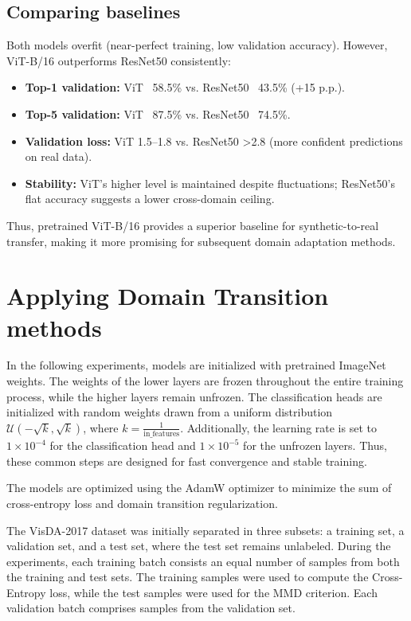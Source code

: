 \documentclass[a4paper,12pt]{extarticle}
\begin{document}
\subsection{Comparing baselines}
Both models overfit (near-perfect training, low validation accuracy). However, ViT-B/16 outperforms ResNet50
consistently:
\begin{itemize}
	\item \textbf{Top-1 validation:} ViT ~58.5\% vs. ResNet50 ~43.5\% (+15 p.p.).
	\item \textbf{Top-5 validation:} ViT ~87.5\% vs. ResNet50 ~74.5\%.
	\item \textbf{Validation loss:} ViT 1.5–1.8 vs. ResNet50 >2.8 (more confident predictions on real data).
	\item \textbf{Stability:} ViT's higher level is maintained despite fluctuations; ResNet50's flat accuracy suggests a lower cross-domain ceiling.
\end{itemize}
Thus, pretrained ViT-B/16 provides a superior baseline for synthetic-to-real transfer, making it more promising for
subsequent domain adaptation methods.

\section{Applying Domain Transition methods}
In the following experiments, models are initialized with pretrained ImageNet weights. The weights of the lower layers
are frozen throughout the entire training process, while the higher layers remain unfrozen. The classification heads
are initialized with random weights drawn from a uniform distribution $\mathcal{U}(-\sqrt{k}, \sqrt{k})$, where $k =
	\frac{1}{\text{in\_features}}$. Additionally, the learning rate is set to $1 \times 10^{-4}$ for the classification
head and $1 \times 10^{-5}$ for the unfrozen layers. Thus, these common steps are designed for fast convergence and
stable training.

The models are optimized using the AdamW optimizer to minimize the sum of cross-entropy loss and domain transition
regularization.

The VisDA-2017 dataset was initially separated in three subsets: a training set, a validation set, and a test set,
where the test set remains unlabeled. During the experiments, each training batch consists an equal number of samples
from both the training and test sets. The training samples were used to compute the Cross-Entropy loss, while the test
samples were used for the MMD criterion. Each validation batch comprises samples from the validation set.
\end{document}

